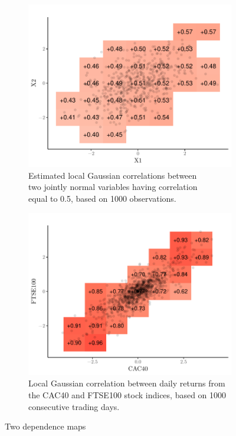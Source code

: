 \begin{figure}[t]
    \centering
    \begin{subfigure}[t]{0.48\textwidth}
      \includegraphics[width=\textwidth]{gaussian-example}
      \caption{Estimated local Gaussian correlations between \\ two jointly normal variables having correlation \\ equal to 0.5, based on 1000 observations.}
    \end{subfigure}
    \begin{subfigure}[t]{0.48\textwidth}
      \includegraphics[width=\textwidth]{returns-example}
      \caption{Local Gaussian correlation between daily returns from the CAC40 and FTSE100 stock indices, based on 1000 consecutive trading days.}
    \end{subfigure}
    \caption{Two dependence maps}
    \label{fig:initial-example}
  \end{figure}
  
